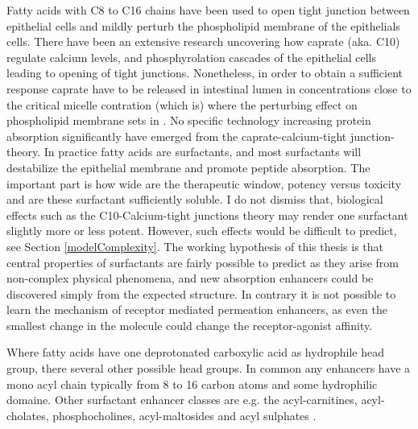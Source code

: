 Fatty acids with C8 to C16 chains have been used to open tight junction between epithelial cells and mildly perturb the phospholipid membrane of the epithelials cells. There have been an extensive research \cite{bruno2013basics,maher2009safety,artursson1990epithelial} uncovering how caprate (aka. C10) regulate calcium levels, and phosphyrolation cascades of the epithelial cells leading to opening of tight junctions. Nonetheless, in order to obtain a sufficient response caprate have to be released in intestinal lumen in concentrations close to the critical micelle contration (which is) where the perturbing effect on phospholipid membrane sets in \cite{bruno2013basics}. No specific technology increasing protein absorption significantly have emerged from the caprate-calcium-tight junction-theory. In practice fatty acids are surfactants, and most surfactants will destabilize the epithelial membrane and promote peptide absorption. The important part is how wide are the therapeutic window, potency versus toxicity and are these surfactant sufficiently soluble. I do not dismiss that, biological effects such as the C10-Calcium-tight junctions theory may render one surfactant slightly more or less potent. However, such effects would be difficult to predict, see Section \ref{modelComplexity}. The working hypothesis of this thesis is that central properties of surfactants are fairly possible to predict as they arise from non-complex physical phenomena, and new absorption enhancers could be discovered simply from the expected structure. In contrary it is not possible to learn the mechanism of receptor mediated permeation enhancers, as even the smallest change in the molecule could change the receptor-agonist affinity.

Where fatty acids have one deprotonated carboxylic acid as hydrophile head group, there several other possible head groups. In common any enhancers have a mono acyl chain typically from 8 to 16 carbon atoms and some hydrophilic domaine. Other surfactant enhancer classes are e.g. the acyl-carnitines, acyl-cholates\cite{lee2000oral}, phosphocholines\cite{liu1999dodecylphosphocholine}, acyl-maltosides \cite{petersen2013colonic} and acyl sulphates \cite{anderberg1993epithelial}.

